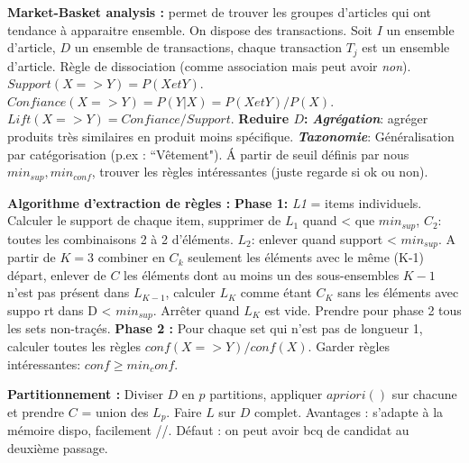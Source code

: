 \documentclass[9pt,a4paper]{report}
\begin{document}
\textbf{Market-Basket analysis :} permet de trouver les groupes d'articles qui ont tendance à apparaitre ensemble. On dispose des transactions. Soit $I$ un ensemble d'article, $D$ un ensemble de transactions, chaque transaction $T_j$ est un ensemble d'article. Règle de dissociation (comme association mais peut avoir \textit{non}).
$Support(X => Y) = P ( X et Y )$.
$Confiance( X =>Y ) = P ( Y | X ) = P ( X et Y ) / P (X)$.
$Lift(X => Y)= Confiance / Support$. \textbf{Reduire $D$:} \textit{\textbf{Agrégation}}: agréger produits très similaires en produit moins spécifique. \textit{\textbf{Taxonomie}}: Généralisation par catégorisation (p.ex : “Vêtement"). Á partir de seuil définis par nous $min_{sup}, min_{conf}$, trouver les règles intéressantes (juste regarde si ok ou non).

\textbf{Algorithme d'extraction de règles :} \textbf{Phase 1:} \textit{L1} = items individuels. Calculer le support de chaque item, supprimer de $L_1$ quand < que $min_{sup}$, \textit{$C_2$}: toutes les combinaisons 2 à 2 d'éléments. \textit{$L_2$}: enlever quand support < $min_{sup}$. A partir de $K=3$ combiner en $C_k$ seulement les éléments avec le même (K-1) départ, enlever de $C$ les éléments dont au moins un des sous-ensembles $K-1$ n'est pas présent dans $L_{K-1}$, calculer $L_K$ comme étant $C_K$ sans les éléments avec suppo    rt dans D < $min_{sup}$. Arrêter quand $L_K$ est vide. Prendre pour phase 2 tous les sets non-traçés.
\textbf{Phase 2 :} Pour chaque set qui n'est pas de longueur 1, calculer toutes les règles $conf(X=>Y)/conf(X)$. Garder règles intéressantes: $conf \geq min_conf$.

\textbf{Partitionnement :} Diviser $D$ en $p$ partitions, appliquer $apriori()$ sur chacune et prendre $C$ = union des $L_p$. Faire $L$ sur $D$ complet. Avantages : s'adapte à la mémoire dispo, facilement //. Défaut : on peut avoir bcq de candidat au deuxième passage.
\end{document}
